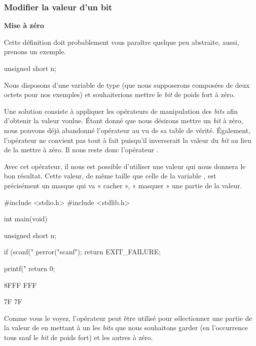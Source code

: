 \begin{infobox}
\subsubsection{Modifier la valeur d'un bit}
\label{modifier-la-valeur-dun-bit}

\textbf{Mise à zéro}
\label{mise-a-zero}

Cette définition doit probablement vous paraître quelque peu abstraite,
aussi, prenons un exemple.

\begin{C}
unsigned short n;
\end{C}

Nous disposons d'une variable  de type
 (que nous supposerons composées de deux octets
pour nos exemples) et souhaiterions mettre le \emph{bit} de poids fort à
zéro.

Une solution consiste à appliquer les opérateurs de manipulation des
\emph{bits} afin d'obtenir la valeur voulue. Étant donné que nous
désirons mettre un \emph{bit} à zéro, nous pouvons déjà abandonné
l'opérateur \mybox{\textbar{}} au vu de sa table de vérité. Également,
l'opérateur \mybox{\^{}} ne convient pas tout à fait puisqu'il
inverserait la valeur du \emph{bit} au lieu de la mettre à zéro. Il nous
reste donc l'opérateur \mybox{\&}.

Avec cet opérateur, il nous est possible d'utiliser une valeur qui nous
donnera le bon résultat. Cette valeur, de même taille que celle de la
variable , est précisément un masque qui va « cacher », «
masquer » une partie de la valeur.

\begin{C}
#include <stdio.h>
#include <stdlib.h>


int main(void)
{
    unsigned short n;

    if (scanf("%
    {
        perror("scanf");
        return EXIT_FAILURE;
    }

    printf("%
    return 0;
}
\end{C}

\begin{C}
8FFF
FFF

7F
7F
\end{C}

Comme vous le voyez, l'opérateur \mybox{\&} peut être utilisé pour
sélectionner une partie de la valeur de  en mettant à un les
\emph{bits} que nous souhaitons garder (en l'occurrence tous sauf le
\emph{bit} de poids fort) et les autres à zéro.


\end{infobox}
